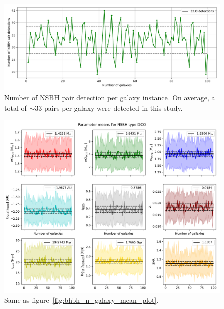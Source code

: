 \begin{figure}[!h]
	\centering
	\includegraphics[width=\columnwidth]{analysis_data/main_analysis_folder/NSBH_n_detections}
	\caption{Number of NSBH pair detection per galaxy instance. On average, a total of $\sim$33 pairs per galaxy were detected in this study.}
	\label{fig:nsbhndetections}
\end{figure}	

\begin{figure}[!h]
	\centering
	\includegraphics[width=\columnwidth]{analysis_data/main_analysis_folder/NSBH_n_galaxy_mean_plot}
	\caption{Same as figure~\ref{fig:bhbh_n_galaxy_mean_plot}.}
	\label{fig:nsbh_n_galaxy_mean_plot}
\end{figure}

\newpage
